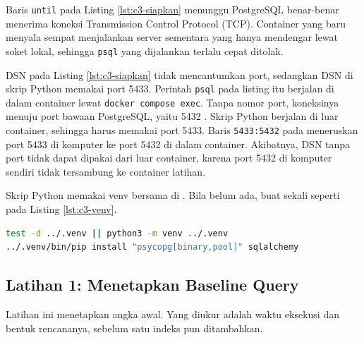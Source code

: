 Baris \texttt{until} pada Listing \ref{lst:c3-siapkan} menunggu PostgreSQL
benar-benar menerima koneksi Transmission Control Protocol (TCP).
Container yang baru menyala sempat
menjalankan server sementara yang hanya mendengar lewat soket lokal, sehingga
\texttt{psql} yang dijalankan terlalu cepat ditolak.

DSN pada Listing \ref{lst:c3-siapkan} tidak mencantumkan port, sedangkan DSN
di skrip Python memakai port 5433. Perintah \texttt{psql} pada listing itu
berjalan di dalam container lewat \texttt{docker compose exec}. Tanpa nomor
port, koneksinya menuju port bawaan PostgreSQL, yaitu 5432
\cite{pgdoc-connections}. Skrip Python berjalan di luar container, sehingga
harus memakai port 5433. Baris \texttt{5433:5432} pada
 meneruskan port 5433 di komputer
ke port 5432 di dalam container. Akibatnya, DSN tanpa port tidak dapat dipakai
dari luar container, karena port 5432 di komputer sendiri tidak tersambung ke
container latihan.

Skrip Python memakai venv bersama di . Bila belum ada,
buat sekali seperti pada Listing \ref{lst:c3-venv}.

\begin{lstlisting}[language=bash, caption={Menyiapkan venv untuk seluruh skrip Python}, label={lst:c3-venv}]
test -d ../.venv || python3 -m venv ../.venv
../.venv/bin/pip install "psycopg[binary,pool]" sqlalchemy
\end{lstlisting}

\subsection*{Latihan 1: Menetapkan Baseline Query}

Latihan ini menetapkan angka awal. Yang diukur adalah waktu eksekusi dan bentuk
rencananya, sebelum satu indeks pun ditambahkan.

